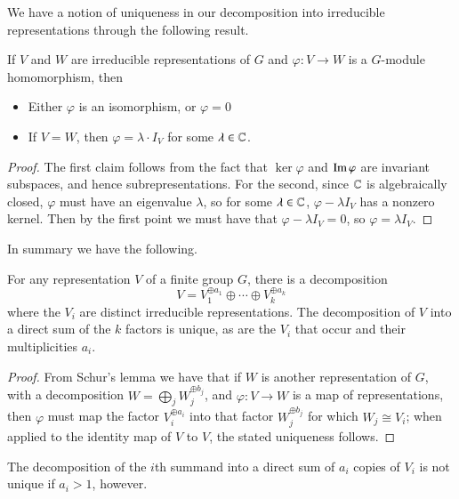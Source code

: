 We have a notion of uniqueness in our decomposition into irreducible representations through the following result.

\begin{lemma}
    If $V$ and $W$ are irreducible representations of $G$ and $\varphi:V\rightarrow W$ is a $G$-module homomorphism, then \begin{itemize}
        \item Either $\varphi$ is an isomorphism, or $\varphi = 0$
        \item If $V = W$, then $\varphi = \lambda\cdot I_V$ for some $\lambda \in \mathbb C$.
    \end{itemize}
\end{lemma}
\begin{proof}
    The first claim follows from the fact that $\ker\varphi$ and $\operatorname{Im}\varphi$ are invariant subspaces, and hence subrepresentations. For the second, since $\mathbb C$ is algebraically closed, $\varphi$ must have an eigenvalue $\lambda$, so for some $\lambda \in \mathbb C$, $\varphi - \lambda I_V$ has a nonzero kernel. Then by the first point we must have that $\varphi - \lambda I_V = 0$, so $\varphi =\lambda I_V$.
\end{proof}
In summary we have the following.

\begin{proposition}
    For any representation $V$ of a finite group $G$, there is a decomposition \begin{equation*}
        V = V_1^{\oplus a_1}\oplus\cdots \oplus V_k^{\oplus a_k}
    \end{equation*}
    where the $V_i$ are distinct irreducible representations. The decomposition of $V$ into a direct sum of the $k$ factors is unique, as are the $V_i$ that occur and their multiplicities $a_i$.
\end{proposition}
\begin{proof}
    From Schur's lemma we have that if $W$ is another representation of $G$, with a decomposition $W = \bigoplus_j W_j^{\oplus b_j}$, and $\varphi:V\rightarrow W$ is a map of representations, then $\varphi$ must map the factor $V_i^{\oplus a_i}$ into that factor $W_j^{\oplus b_j}$ for which $W_j\cong V_i$; when applied to the identity map of $V$ to $V$, the stated uniqueness follows.
\end{proof}

The decomposition of the $i$th summand into a direct sum of $a_i$ copies of $V_i$ is not unique if $a_i > 1$, however.


